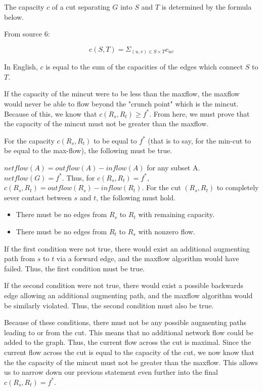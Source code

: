 \documentclass[12pt]{amsart}
\begin{document}
    The capacity $c$ of a cut separating $G$ into $S$ and $T$ is
    determined by the formula below.

    \begin{center}
    From source 6:
    \end{center}
    
    \[
        c(S, T) = \Sigma_{ \left( u, v \right) \in S \times T }
            c_{uv}
    \]

    In English, $c$ is equal to the sum of the capacities of the
    edges which connect $S$ to $T$.

    If the capacity of the mincut were to be less than the
    maxflow, the maxflow would never be able to flow beyond the
    "crunch point" which is the mincut. Because of this, we know
    that $c(R_s, R_t) \ge f^*$. From here, we must prove that
    the capacity of the mincut must not be greater than the
    maxflow.

    For the capacity $c(R_s, R_t)$ to be equal to $f^*$ (that is
    to say, for the min-cut to be equal to the max-flow), the
    following must be true.

    $netflow(A) = outflow(A) - inflow(A)$ for any subset A.
    $netflow(G) = f^*$. Thus, for $c(R_s, R_t) = f^*$,
    $c(R_s, R_t) = outflow(R_s) - inflow(R_t)$. For the cut
    $(R_s, R_t)$ to completely sever contact between $s$ and
    $t$, the following must hold.

    \begin{itemize}
        \item There must be no edges from $R_s$ to $R_t$ with
            remaining capacity.
        \item There must be no edges from $R_t$ to $R_s$ with
            nonzero flow.
    \end{itemize}

    If the first condition were not true, there would exist an
    additional augmenting path from $s$ to $t$ via a forward
    edge, and the maxflow algorithm would have failed. Thus, the
    first condition must be true.

    If the second condition were not true, there would exist a
    possible backwards edge allowing an additional augmenting
    path, and the maxflow algorithm would be similarly violated.
    Thus, the second condition must also be true.

    Because of these conditions, there must not be any possible
    augmenting paths leading to or from the cut. This means that
    no additional network flow could be added to the graph.
    Thus, the current flow across the cut is maximal. Since the
    current flow across the cut is equal to the capacity of the
    cut, we now know that the the capacity of the mincut must
    not be greater than the maxflow. This allows us to narrow
    down our previous statement even further into the final
    $c(R_s, R_t) = f^*$.
\end{document}
